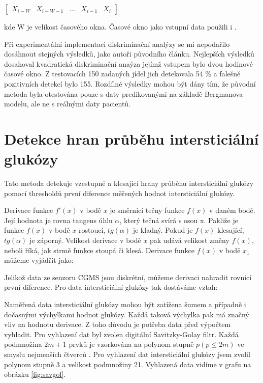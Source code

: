 $\begin{bmatrix}
X_{i-W} & X_{i-W-1} & ... & X_{i-1} & X_{i}
\end{bmatrix}$

\noindent kde W je velikost časového okna. Časové okno jako vstupní data použili i \citet{analyzaCHO.LDA}.

Při experimentální implementaci diskriminační analýzy se mi nepodařilo dosáhnout stejných výsledků, jako autoři původního článku. Nejlepších výsledků dosahoval kvadratická diskriminační anaýza jejímž vstupem bylo dvou hodinové časové okno. Z testovacích 150 zadaných jídel jich detekovala 54 \% a falešně pozitivních detekcí bylo 155. Rozdílné výsledky mohou být dány tím, že původní metoda byla otestována pouze s daty predikovanými na základě Bergmanova modelu, ale ne s reálnými daty pacientů.

\section{Detekce hran průběhu intersticiální glukózy}
\label{ch:threshold}

Tato metoda detekuje vzestupné a klesající hrany průběhu intersticiální glukózy pomocí thresholdů první diference měřených hodnot intersticiální glukózy.

Derivace funkce $f'(x)$ v bodě $x$ je směrnicí tečny funkce $f(x)$ v daném bodě. Její hodnota je rovna tangens úhlu $\alpha$, který tečná svírá s osou x. Pakliže je funkce $f(x)$ v bodě $x$ rostoucí, $tg(\alpha)$ je kladný. Pokud je $f(x)$ klesající, $tg(\alpha)$ je záporný. Velikost derivace v bodě $x$ pak udává velikost změny $f(x)$, neboli říká, jak strmě funkce stoupá či klesá. Derivace funkce $f(x)$ v bodě $x_{1}$ můžeme vyjádřit jako:


Jelikož data ze senzoru CGMS jsou diskrétní, můžeme derivaci nahradit rovnicí první diference. Pro data intersticiální glukózy tak dostáváme vztah:


Naměřená data intersticiální glukózy mohou být zatížena šumem a případně i dočasnými výchylkami hodnot glukózy. Každá taková výchylka pak má značný vliv na hodnotu derivace. Z toho důvodu je potřeba data před výpočtem vyhladit. Pro vyhlazení dat byl zvolen digitální Savitzky-Golay filtr. Každá podmnožina $2m+1$ prvků je vzorkována na polynom stupně $p (p\leq 2m)$ ve smyslu nejmenších čtverců \citep{cho.savgol}. Pro vyhlazení dat intersticiální glukózy jsem zvolil polynom stupně 3 a velikost podmnožiny 21. Vyhlazená data vidíme v grafu na obrázku \ref{fig:savgol}.


